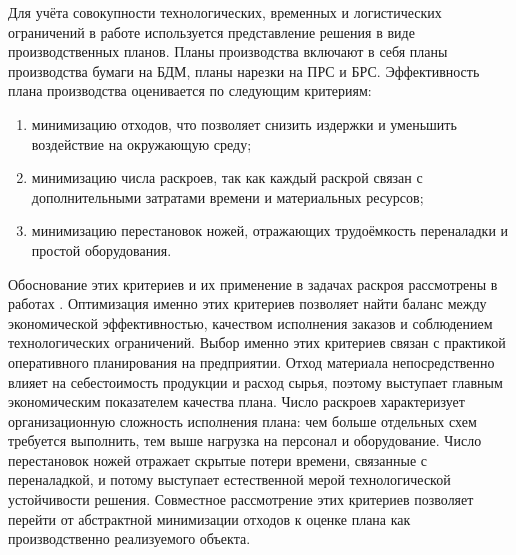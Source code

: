 Для учёта совокупности технологических, временных и логистических ограничений в работе используется представление решения в виде производственных планов.
Планы производства включают в себя планы производства бумаги на БДМ, планы нарезки на ПРС и БРС.
Эффективность плана производства оценивается по следующим критериям:
\begin{enumerate}
    \item минимизацию отходов, что позволяет снизить издержки и уменьшить воздействие на окружающую среду;
    \item минимизацию числа раскроев, так как каждый раскрой связан с дополнительными затратами времени и материальных ресурсов;
    \item минимизацию перестановок ножей, отражающих трудоёмкость переналадки и простой оборудования.
\end{enumerate}
Обоснование этих критериев и их применение в задачах раскроя рассмотрены в работах \cite{haessler1991, cerqueira2021, vanderbeck2000, cyberleninka_slitting_params, mobasher2013}.
Оптимизация именно этих критериев позволяет найти баланс между экономической эффективностью, качеством исполнения заказов и соблюдением технологических ограничений.
Выбор именно этих критериев связан с практикой оперативного планирования на предприятии. Отход материала непосредственно влияет на себестоимость продукции и расход сырья, поэтому выступает главным экономическим показателем качества плана. Число раскроев характеризует организационную сложность исполнения плана: чем больше отдельных схем требуется выполнить, тем выше нагрузка на персонал и оборудование. Число перестановок ножей отражает скрытые потери времени, связанные с переналадкой, и потому выступает естественной мерой технологической устойчивости решения. Совместное рассмотрение этих критериев позволяет перейти от абстрактной минимизации отходов к оценке плана как производственно реализуемого объекта.

